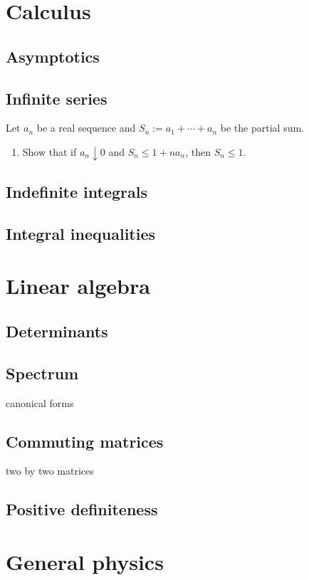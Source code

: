 \documentclass{../../large}
\begin{document}
\chapter{Calculus}
\section{Asymptotics}
\section{Infinite series}
Let $a_n$ be a real sequence and $S_n:=a_1+\cdots+a_n$ be the partial sum.
\begin{enumerate}
\item Show that if $a_n\downarrow0$ and $S_n\le1+na_n$, then $S_n\le1$.
\end{enumerate}
\section{Indefinite integrals}
\section{Integral inequalities}



\chapter{Linear algebra}
\section{Determinants}

\section{Spectrum}
canonical forms

\section{Commuting matrices}
two by two matrices

\section{Positive definiteness}





\chapter{General physics}
\end{document}

